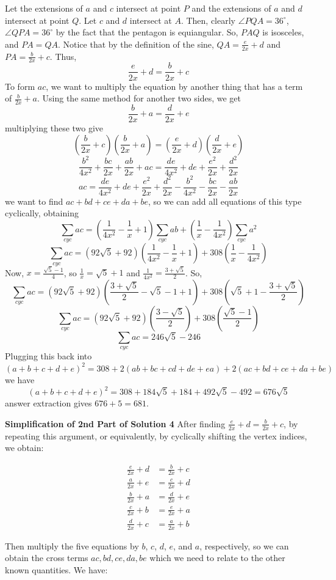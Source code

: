 \begin{enumerate}
 Let the extensions of $a$ and $c$ intersect at point $P$ and the extensions of $a$ and $d$ intersect at point $Q$. Let $c$ and $d$ intersect at $A$. Then, clearly $\angle PQA=36^{\circ}$, $\angle QPA=36^{\circ}$ by the fact that the pentagon is equiangular. So, $PAQ$ is isosceles, and $PA=QA$. Notice that by the definition of the sine, $QA=\frac{e}{2x}+d$ and $PA=\frac{b}{2x}+c$. Thus, 
 \[\frac{e}{2x}+d=\frac{b}{2x}+c\]To form $ac$, we want to multiply the equation by another thing that has a term of $\frac{b}{2x}+a$. Using the same method for another two sides, we get
 \[\frac{b}{2x}+a=\frac{d}{2x}+e\]multiplying these two give
 \[(\frac{b}{2x}+c)(\frac{b}{2x}+a)=(\frac{e}{2x}+d)(\frac{d}{2x}+e)\]
 \[\frac{b^2}{4x^2}+\frac{bc}{2x}+\frac{ab}{2x}+ac=\frac{de}{4x^2}+de+\frac{e^2}{2x}+\frac{d^2}{2x}\]
 \[ac=\frac{de}{4x^2}+de+\frac{e^2}{2x}+\frac{d^2}{2x}-\frac{b^2}{4x^2}-\frac{bc}{2x}-\frac{ab}{2x}\]we want to find $ac+bd+ce+da+be$, so we can add all equations of this type cyclically, obtaining
 \[\sum_{cyc}ac=(\frac{1}{4x^2}-\frac{1}{x}+1)\sum_{cyc}ab+(\frac{1}{x}-\frac{1}{4x^2})\sum_{cyc}a^2\]
 \[\sum_{cyc}ac=(92\sqrt5+92)(\frac{1}{4x^2}-\frac{1}{x}+1)+308(\frac{1}{x}-\frac{1}{4x^2})\]Now, $x=\frac{\sqrt5-1}{4}$, so $\frac{1}{x}=\sqrt5+1$ and $\frac{1}{4x^2}=\frac{3+\sqrt5}{2}$. So,
 \[\sum_{cyc}ac=(92\sqrt5+92)(\frac{3+\sqrt5}{2}-\sqrt5-1+1)+308(\sqrt5+1-\frac{3+\sqrt5}{2})\]
 \[\sum_{cyc}ac=(92\sqrt5+92)(\frac{3-\sqrt5}{2})+308(\frac{\sqrt5-1}{2})\]
 \[\sum_{cyc}ac=246\sqrt5-246\]Plugging this back into $(a+b+c+d+e)^2=308+2(ab+bc+cd+de+ea)+2(ac+bd+ce+da+be)$ we have
 \[(a+b+c+d+e)^2=308+184\sqrt5+184+492\sqrt5-492=676\sqrt5\]answer extraction gives $676+5=\boxed{681}$.

 \textbf{Simplification of 2nd Part of Solution 4} After finding $\frac{e}{2x}+d=\frac{b}{2x}+c$, by repeating this argument, or equivalently, by cyclically shifting the vertex indices, we obtain:

 
 \begin{align*} \frac{e}{2x} + d &= \frac{b}{2x} + c \\ \frac{a}{2x} + e &= \frac{c}{2x} + d \\ \frac{b}{2x} + a &= \frac{d}{2x} + e \\ \frac{c}{2x} + b &= \frac{e}{2x} + a \\ \frac{d}{2x} + c &= \frac{a}{2x} + b \end{align*}


 Then multiply the five equations by $b$, $c$, $d$, $e$, and $a$, respectively, so we can obtain the cross terms $ac, bd, ce, da, be$ which we need to relate to the other known quantities. We have:


\end{enumerate}

